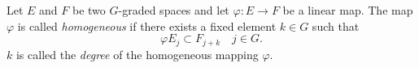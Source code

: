 Let $E$ and $F$ be two $G$-graded spaces and let $\varphi: E \rightarrow F$ be a linear map. The map $\varphi$ is called \textit{homogeneous} if there exists a fixed element $k \in G$ such that
$$\varphi E_j \subset F_{j+k} \quad j \in G.$$
$k$ is called the \textit{degree} of the homogeneous mapping $\varphi$.
